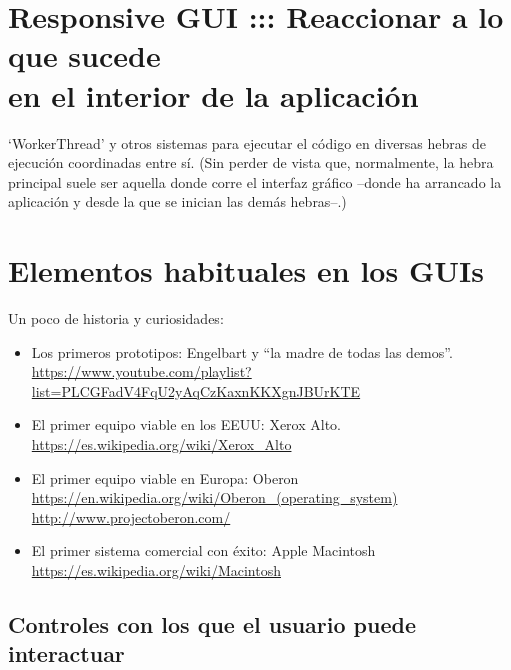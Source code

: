 \documentclass[spanish,12pt,a4paper,final,oneside]{book}
\begin{document}
\section{Responsive GUI ::: Reaccionar a lo que sucede \\ en el interior de la aplicación}
`WorkerThread' y otros sistemas para ejecutar el código en diversas hebras de ejecución coordinadas entre sí. (Sin perder de vista que, normalmente, la hebra principal suele ser aquella donde corre el interfaz gráfico --donde ha arrancado la aplicación y desde la que se inician las demás hebras--.)

\section{Elementos habituales en los GUIs}

Un poco de historia y curiosidades:
\begin{itemize}
\item Los primeros prototipos: Engelbart y ``la madre de todas las demos''. \url{https://www.youtube.com/playlist?list=PLCGFadV4FqU2yAqCzKaxnKKXgnJBUrKTE}
\item El primer equipo viable en los EEUU: Xerox Alto.
\\ \url{https://es.wikipedia.org/wiki/Xerox_Alto}
\item El primer equipo viable en Europa: Oberon 
\\ \url{https://en.wikipedia.org/wiki/Oberon_(operating_system)}
\\ \url{http://www.projectoberon.com/}
\item El primer sistema comercial con éxito: Apple Macintosh
\\ \url{https://es.wikipedia.org/wiki/Macintosh}
\end{itemize}

\subsection{Controles con los que el usuario puede interactuar}
\end{document}
